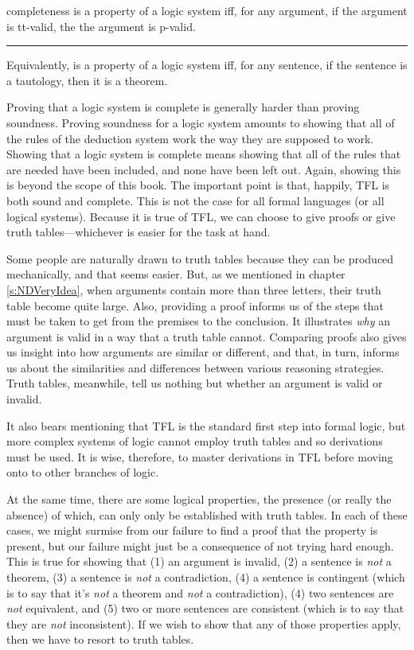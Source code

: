 \begin{factboxy}{completeness}\label{def:completeness}
 is a property of a logic system iff, for any argument, if the argument is tt-valid, the the argument is p-valid.
\medskip
\hrule
\medskip
Equivalently,  is a property of a logic system iff, for any sentence, if the sentence is a tautology, then it is a theorem.
\end{factboxy}

Proving that a logic system is complete is generally harder than proving soundness. Proving soundness for a logic system amounts to showing that all of the rules of the deduction system work the way they are supposed to work. Showing that a logic system is complete means showing that all of the rules that are needed have been included, and none have been left out.
Again, showing this is beyond the scope of this book. The important point is that, happily, TFL is both sound and complete. This is not the case for all formal languages (or all logical systems). Because it is true of TFL, we can choose to give proofs or give truth tables---whichever is easier for the task at hand.

Some people are naturally drawn to truth tables because they can be produced mechanically, and that seems easier. But, as we mentioned in chapter \ref{s:NDVeryIdea}, when arguments contain more than three letters, their truth table become quite large. Also, providing a proof informs us of the steps that must be taken to get from the premises to the conclusion. It illustrates \textit{why} an argument is valid in a way that a truth table cannot. Comparing proofs also gives us insight into how arguments are similar or different, and that, in turn, informs us about the similarities and differences between various reasoning strategies. Truth tables, meanwhile, tell us nothing but whether an argument is valid or invalid.

It also bears mentioning that TFL is the standard first step into formal logic, but more complex systems of logic cannot employ truth tables and so derivations must be used. It is wise, therefore, to master derivations in TFL before moving onto to other branches of logic. 

At the same time, there are some logical properties, the presence (or really the absence) of which, can only only be established with truth tables. In each of these cases, we might surmise from our failure to find a proof that the property is present, but our failure might just be a consequence of not trying hard enough. This is true for showing that (1) an argument is invalid, (2) a sentence is \textit{not} a theorem, (3) a sentence is \textit{not} a contradiction, (4) a sentence is contingent (which is to say that it's \textit{not} a theorem and \textit{not} a contradiction), (4) two sentences are \textit{not} equivalent, and (5) two or more sentences are consistent (which is to say that they are \textit{not} inconsistent). If we wish to show that any of those properties apply, then we have to resort to truth tables. 


